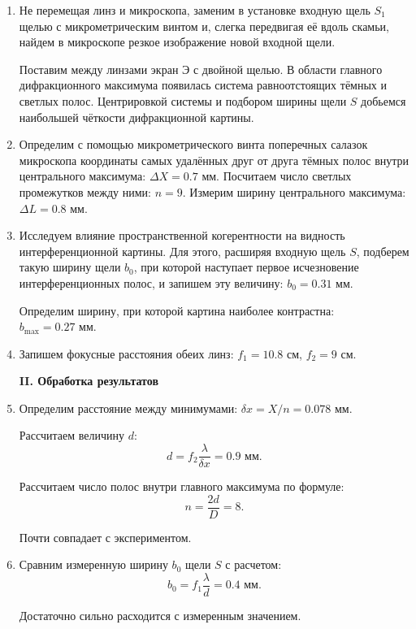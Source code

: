 \documentclass[12pt,a4paper]{article}
\begin{document}
	\begin{enumerate}
		\item Не перемещая линз и микроскопа, заменим в установке входную щель $S_1$ щелью с микрометрическим винтом и, слегка передвигая её вдоль скамьи, найдем в микроскопе резкое изображение новой входной щели.
		
		Поставим между линзами экран Э с двойной щелью. В области главного дифракционного максимума появилась система равноотстоящих тёмных и светлых полос. Центрировкой системы и подбором ширины щели $S$ добьемся наибольшей чёткости дифракционной картины.
		
		\item Определим с помощью микрометрического винта поперечных салазок микроскопа координаты самых удалённых друг от друга тёмных полос внутри центрального максимума: $\Delta X = 0.7$ мм.
		Посчитаем число светлых промежутков между ними: $n = 9$. Измерим ширину центрального максимума: $\Delta L = 0.8$ мм.
		
		\item Исследуем влияние пространственной когерентности на видность интерференционной картины. Для этого, расширяя входную щель $S$, подберем такую ширину щели $b_0$, при которой наступает первое исчезновение интерференционных полос, и запишем эту величину: $b_0 = 0.31$ мм.
		
		Определим ширину, при которой картина наиболее контрастна: \\ $b_\text{max} = 0.27$ мм.
		
		\item Запишем фокусные расстояния обеих линз: $f_1 = 10.8$ см, $f_2 = 9$ см.
		
		
		
		\begin{center}
			\textbf{II. Обработка результатов}
		\end{center}
	
		\item Определим расстояние между минимумами: $\delta x = X / n = 0.078$ мм.
		
		Рассчитаем величину $d$:
		\begin{equation*}
			d = f_2 \frac{\lambda}{\delta x} = 0.9 \text{ мм.}
		\end{equation*}
		
		Рассчитаем число полос внутри главного максимума по формуле:
		\begin{equation*}
			n = \frac{2d}{D} = 8.
		\end{equation*}
	
		Почти совпадает с экспериментом.
		
		\item Сравним измеренную ширину $b_0$ щели $S$ с расчетом:
		\begin{equation*}
			b_0 = f_1 \frac{\lambda}{d} = 0.4 \text{ мм.}
		\end{equation*}
		
		Достаточно сильно расходится с измеренным значением.
	\end{enumerate}
\end{document}
